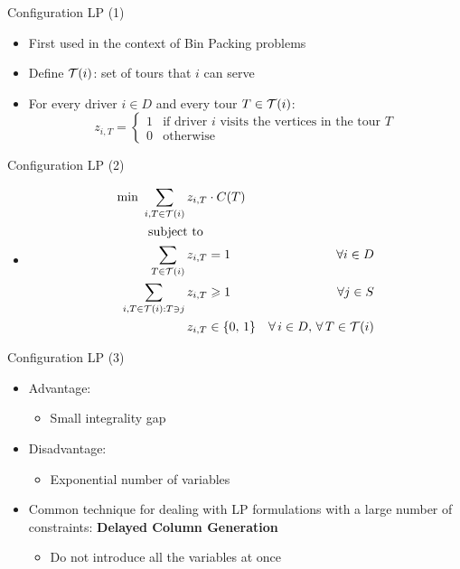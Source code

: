 \begin{frame}[t]{Configuration LP (1)}
    \begin{itemize}
        \item<1-> First used in the context of Bin Packing problems
        \item<2-> Define $\mathcal{T}(i)$: set of tours that $i$ can serve        
        \item<3-> For every driver $i \in D$ and every tour $T \in \mathcal{T}(i)$:
        \[
            z_{i, T} =
                \begin{cases}
                    1 & \text{if driver $i$ visits the vertices in the tour $T$} \\
                    0 & \text{otherwise}
                \end{cases}
        \]
    \end{itemize}
\end{frame}
\begin{frame}[t]{Configuration LP (2)}
    \begin{itemize}
        \item<1->[ ] \begin{align}
            \text {min } \label{cg_obj}	 \sum_{ i, 	T \in \mathcal{T}(i) } z_{i, T} & \cdot C(T) &    &  \\
            \text{subject to }             & & \nonumber  \\
            \label{const:cg1}       \sum_{ T \in \mathcal{T}(i) } z_{ i, T } & = 1  &   \forall i \in D \\
            \label{const:cg2}       \sum_{ i, T \in \mathcal{T}(i): T \ni j } z_{ i, T } & \geqslant 1   &   \forall j \in S \\
            \label{consT:cg3}       z_{ i, T } & \in \{0,\, 1\}    & \forall \, i \in D, \, \forall \, T \in \mathcal{T}(i) 
        \end{align}        
    \end{itemize}
\end{frame}

\begin{frame}[t]{Configuration LP (3)}
    \begin{itemize}
        \item<1-> Advantage:
            \begin{itemize}
                \item<2-> Small integrality gap
            \end{itemize}
        \item<3-> Disadvantage: 
            \begin{itemize}
                \item<4-> Exponential number of variables
            \end{itemize}
        \item<5-> Common technique for dealing with LP formulations with a large number of constraints: \textbf{Delayed Column Generation}
            \begin{itemize}
                \item<6-> Do not introduce all the variables at once
            \end{itemize}
    \end{itemize}
\end{frame}

